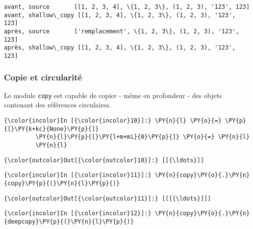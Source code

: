     \begin{Verbatim}[commandchars=\\\{\}]
avant, source       [[1, 2, 3, 4], \{1, 2, 3\}, (1, 2, 3), '123', 123]
avant, shallow\_copy [[1, 2, 3, 4], \{1, 2, 3\}, (1, 2, 3), '123', 123]
après, source       ['remplacement', \{1, 2, 3\}, (1, 2, 3), '123', 123]
après, shallow\_copy [[1, 2, 3, 4], \{1, 2, 3\}, (1, 2, 3), '123', 123]

    \end{Verbatim}

    \hypertarget{copie-et-circularituxe9}{%
\subsubsection{Copie et circularité}\label{copie-et-circularituxe9}}

    Le module \texttt{copy} est capable de copier - même en profondeur - des
objets contenant des références circulaires.

    \begin{Verbatim}[commandchars=\\\{\}]
{\color{incolor}In [{\color{incolor}10}]:} \PY{n}{l} \PY{o}{=} \PY{p}{[}\PY{k+kc}{None}\PY{p}{]}
         \PY{n}{l}\PY{p}{[}\PY{l+m+mi}{0}\PY{p}{]} \PY{o}{=} \PY{n}{l}
         \PY{n}{l}
\end{Verbatim}


\begin{Verbatim}[commandchars=\\\{\}]
{\color{outcolor}Out[{\color{outcolor}10}]:} [[{\ldots}]]
\end{Verbatim}
            
    \begin{Verbatim}[commandchars=\\\{\}]
{\color{incolor}In [{\color{incolor}11}]:} \PY{n}{copy}\PY{o}{.}\PY{n}{copy}\PY{p}{(}\PY{n}{l}\PY{p}{)}
\end{Verbatim}


\begin{Verbatim}[commandchars=\\\{\}]
{\color{outcolor}Out[{\color{outcolor}11}]:} [[[{\ldots}]]]
\end{Verbatim}
            
    \begin{Verbatim}[commandchars=\\\{\}]
{\color{incolor}In [{\color{incolor}12}]:} \PY{n}{copy}\PY{o}{.}\PY{n}{deepcopy}\PY{p}{(}\PY{n}{l}\PY{p}{)}
\end{Verbatim}


